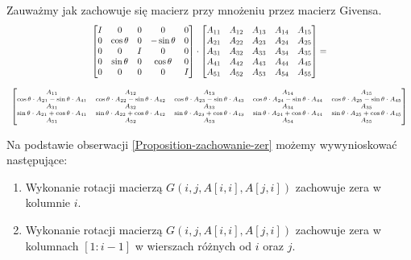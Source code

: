 \documentclass[12pt,a4paper]{report}
\newcommand{\mx}[1]{{#1}}
\begin{document}
\begin{proposition} \label{Proposition-zachowanie-zer}
Zauważmy jak zachowuje się macierz przy mnożeniu przez macierz Givensa.
{
\begin{equation*}
\begin{array}{c}
\begin{bmatrix}
I & 0 & 0 & 0 & 0 \\
0 & \cos\theta & 0 & -\sin\theta & 0 \\
0 & 0 & I & 0 & 0 \\
0 & \sin\theta & 0 & \cos\theta & 0 \\
0 & 0 & 0 & 0 & I
\end{bmatrix} \cdot \begin{bmatrix}
A_{11} & A_{12} & A_{13} & A_{14} & A_{15} \\
A_{21} & A_{22} & A_{23} & A_{24} & A_{25} \\
A_{31} & A_{32} & A_{33} & A_{34} & A_{35} \\
A_{41} & A_{42} & A_{43} & A_{44} & A_{45} \\
A_{51} & A_{52} & A_{53} & A_{54} & A_{55}
\end{bmatrix} = \\ \\
{\scriptsize
\begin{bmatrix}
A_{11} & A_{12} & A_{13} & A_{14} & A_{15} \\
\cos\theta \cdot A_{21} - \sin\theta\cdot A_{41} & \cos\theta \cdot A_{22}- \sin\theta\cdot A_{42} & \cos\theta \cdot A_{23}- \sin\theta\cdot A_{43} & \cos\theta \cdot A_{24}- \sin\theta\cdot A_{44} & \cos\theta \cdot A_{25}- \sin\theta\cdot A_{45} \\
A_{31} & A_{32} & A_{33} & A_{34} & A_{35} \\
\sin\theta\cdot A_{21} + \cos\theta\cdot A_{41} & \sin\theta\cdot A_{22} + \cos\theta\cdot A_{42} & \sin\theta\cdot A_{23} + \cos\theta\cdot A_{43} & \sin\theta\cdot A_{24} + \cos\theta\cdot A_{44} & \sin\theta\cdot A_{25} + \cos\theta\cdot A_{45} \\
A_{51} & A_{52} & A_{53} & A_{54} & A_{55} 
\end{bmatrix}
}
\end{array}
\end{equation*}
}
\end{proposition}

\begin{proposition}\label{Proposition-zera-w-kolumnie}
Na podstawie obserwacji \ref{Proposition-zachowanie-zer} możemy wywynioskować następujące:
\begin{enumerate}
\item Wykonanie rotacji macierzą $\mx{G}(i,j, \mx{A}[i,i], \mx{A}[j,i])$ zachowuje zera w kolumnie $i$.
\item Wykonanie rotacji macierzą $\mx{G}(i,j, \mx{A}[i,i], \mx{A}[j,i])$ zachowuje zera w kolumnach $[1:i-1]$ w wierszach różnych od $i$ oraz $j$.
\end{enumerate}
\end{proposition}
\end{document}

